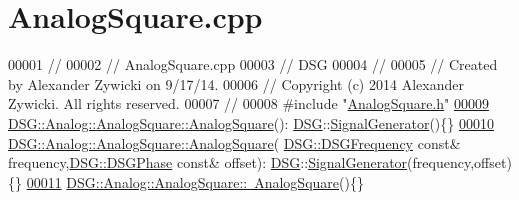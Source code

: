 \hypertarget{_analog_square_8cpp_source}{\section{Analog\+Square.\+cpp}
\label{_analog_square_8cpp_source}
}

\begin{DoxyCode}
00001 \textcolor{comment}{//}
00002 \textcolor{comment}{//  AnalogSquare.cpp}
00003 \textcolor{comment}{//  DSG}
00004 \textcolor{comment}{//}
00005 \textcolor{comment}{//  Created by Alexander Zywicki on 9/17/14.}
00006 \textcolor{comment}{//  Copyright (c) 2014 Alexander Zywicki. All rights reserved.}
00007 \textcolor{comment}{//}
00008 \textcolor{preprocessor}{#include "\hyperlink{_analog_square_8h}{AnalogSquare.h}"}
\hypertarget{_analog_square_8cpp_source_l00009}{}\hyperlink{class_d_s_g_1_1_analog_1_1_analog_square_a7425ebd7e39129178eb050a04cd9d5d6}{00009} \hyperlink{class_d_s_g_1_1_analog_1_1_analog_square_a7425ebd7e39129178eb050a04cd9d5d6}{DSG::Analog::AnalogSquare::AnalogSquare}():
      \hyperlink{namespace_d_s_g}{DSG}::\hyperlink{class_d_s_g_1_1_signal_generator}{SignalGenerator}()\{\}
\hypertarget{_analog_square_8cpp_source_l00010}{}\hyperlink{class_d_s_g_1_1_analog_1_1_analog_square_a886eb67edded43efca895741559a55f4}{00010} \hyperlink{class_d_s_g_1_1_analog_1_1_analog_square_a7425ebd7e39129178eb050a04cd9d5d6}{DSG::Analog::AnalogSquare::AnalogSquare}(
      \hyperlink{namespace_d_s_g_a4315a061386fa1014fda09b15d3a6973}{DSG::DSGFrequency} \textcolor{keyword}{const}& frequency,\hyperlink{namespace_d_s_g_a44431ce1eb0a7300efdd207bc879e52c}{DSG::DSGPhase} \textcolor{keyword}{const}& offset):
      \hyperlink{namespace_d_s_g}{DSG}::\hyperlink{class_d_s_g_1_1_signal_generator}{SignalGenerator}(frequency,offset)\{\}
\hypertarget{_analog_square_8cpp_source_l00011}{}\hyperlink{class_d_s_g_1_1_analog_1_1_analog_square_a17b3928f19cb6bf0c151b5e1159de1db}{00011} \hyperlink{class_d_s_g_1_1_analog_1_1_analog_square_a17b3928f19cb6bf0c151b5e1159de1db}{DSG::Analog::AnalogSquare::~AnalogSquare}()\{\}
\end{DoxyCode}
